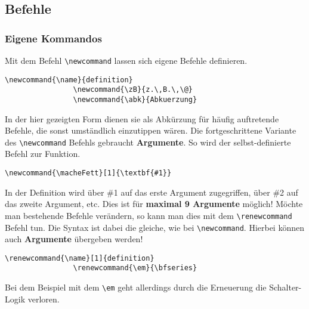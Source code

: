 \documentclass[10pt]{article}  %
\begin{document}
    \subsection{Befehle}
        \subsubsection{Eigene Kommandos}
            Mit dem Befehl \verb!\newcommand! lassen sich eigene Befehle definieren.
            \lstset{language=TeX}
            \begin{lstlisting}[frame=single]
                \newcommand{\name}{definition}
                \newcommand{\zB}{z.\,B.\,\@}
                \newcommand{\abk}{Abkuerzung}
            \end{lstlisting}
            In der hier gezeigten Form dienen sie als Abkürzung für häufig auftretende Befehle, die sonst umständlich einzutippen wären.
            Die fortgeschrittene Variante des \verb!\newcommand! Befehls gebraucht \textbf{Argumente}. So wird der selbst-definierte Befehl zur Funktion.
            \lstset{language=TeX}
            \begin{lstlisting}[frame=single]
                \newcommand{\macheFett}[1]{\textbf{#1}}
            \end{lstlisting}
            In der Definition wird über \#1 auf das erste Argument zugegriffen, über \#2 auf das zweite Argument, etc. Dies ist für \textbf{maximal 9 Argumente} möglich!
            Möchte man bestehende Befehle verändern, so kann man dies mit dem \verb!\renewcommand! Befehl tun. Die Syntax ist dabei die gleiche, wie bei \verb!\newcommand!. Hierbei können auch \textbf{Argumente} übergeben werden!
            \lstset{language=TeX}
            \begin{lstlisting}[frame=single]
                \renewcommand{\name}[1]{definition}
                \renewcommand{\em}{\bfseries}
            \end{lstlisting}
            Bei dem Beispiel mit dem \verb!\em! geht allerdings durch die Erneuerung die Schalter-Logik verloren.
\end{document}
